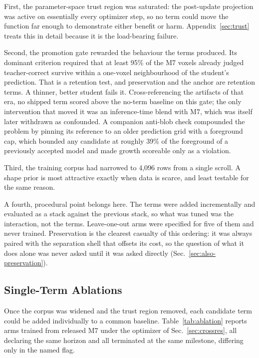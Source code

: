 First, the parameter-space trust region was saturated: the post-update
projection was active on essentially every optimizer step, so no term could
move the function far enough to demonstrate either benefit or harm.
Appendix~\ref{sec:trust} treats this in detail because it is the load-bearing
failure.

Second, the promotion gate rewarded the behaviour the terms produced.
Its dominant criterion required that at least 95\% of the M7 voxels already
judged teacher-correct survive within a one-voxel neighbourhood of the
student's prediction.
That is a retention test, and preservation and the anchor are retention terms.
A thinner, better student fails it.
Cross-referencing the artifacts of that era, no shipped term scored above the
no-term baseline on this gate; the only intervention that moved it was an
inference-time blend with M7, which was itself later withdrawn as confounded.
A companion anti-blob check compounded the problem by pinning its reference to
an older prediction grid with a foreground cap, which bounded any candidate at
roughly 39\% of the foreground of a previously accepted model and made growth
scoreable only as a violation.

Third, the training corpus had narrowed to 4,096 rows from a single scroll.
A shape prior is most attractive exactly when data is scarce, and least
testable for the same reason.

A fourth, procedural point belongs here.
The terms were added incrementally and evaluated as a stack against the previous
stack, so what was tuned was the interaction, not the terms.
Leave-one-out arms were specified for five of them and never trained.
Preservation is the clearest casualty of this ordering: it was always paired
with the separation shell that offsets its cost, so the question of what it does
alone was never asked until it was asked directly
(Sec.~\ref{sec:also-preservation}).

\subsection{Single-Term Ablations}
\label{sec:also-single}

Once the corpus was widened and the trust region removed, each candidate term
could be added individually to a common baseline.
Table~\ref{tab:ablation} reports arms trained from released M7 under the
optimizer of Sec.~\ref{sec:crossres}, all declaring the same horizon and all
terminated at the same milestone, differing only in the named flag.


